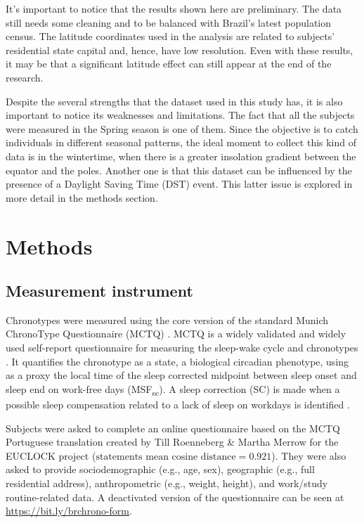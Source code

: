 \documentclass[
12pt,
openright,
oneside,
a4paper,
chapter=TITLE,
section=TITLE,
french,
spanish,
brazil,
english
]{abntex2}\usepackage{array}
\begin{document}
It's important to notice that the results shown here are preliminary.
The data still needs some cleaning and to be balanced with Brazil's
latest population census. The latitude coordinates used in the analysis
are related to subjects' residential state capital and, hence, have low
resolution. Even with these results, it may be that a significant
latitude effect can still appear at the end of the research.

Despite the several strengths that the dataset used in this study has,
it is also important to notice its weaknesses and limitations. The fact
that all the subjects were measured in the Spring season is one of them.
Since the objective is to catch individuals in different seasonal
patterns, the ideal moment to collect this kind of data is in the
wintertime, when there is a greater insolation gradient between the
equator and the poles. Another one is that this dataset can be
influenced by the presence of a Daylight Saving Time (DST) event. This
latter issue is explored in more detail in the methods section.

\section{Methods}\label{methods}

\subsection{Measurement instrument}\label{measurement-instrument}

Chronotypes were measured using the core version of the standard Munich
ChronoType Questionnaire (MCTQ) \autocite{roenneberg2003}. MCTQ is a
widely validated and widely used self-report questionnaire for measuring
the sleep-wake cycle and chronotypes \autocite{roenneberg2019}. It
quantifies the chronotype as a state, a biological circadian phenotype,
using as a proxy the local time of the sleep corrected midpoint between
sleep onset and sleep end on work-free days (MSF\textsubscript{sc}). A
sleep correction (SC) is made when a possible sleep compensation related
to a lack of sleep on workdays is identified \autocite{roenneberg2012}.

Subjects were asked to complete an online questionnaire based on the
MCTQ Portuguese translation created by Till Roenneberg \& Martha Merrow
for the EUCLOCK project \autocite{roenneberg2006}
(\(\text{statements mean cosine distance} = 0.921\)). They were also
asked to provide sociodemographic (e.g., age, sex), geographic (e.g.,
full residential address), anthropometric (e.g., weight, height), and
work/study routine-related data. A deactivated version of the
questionnaire can be seen at \url{https://bit.ly/brchrono-form}.
\end{document}
